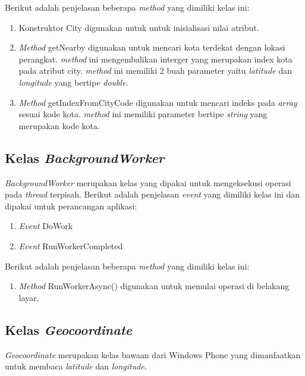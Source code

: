 Berikut adalah penjelasan beberapa \textit{method} yang dimiliki kelas ini:
\begin{enumerate}
	\item Konstruktor City digunakan untuk untuk inisialisasi nilai atribut.
	\item \textit{Method} getNearby digunakan untuk mencari kota terdekat dengan lokasi perangkat. \textit{method} ini mengembalikan interger yang merupakan index kota pada atribut city. \textit{method} ini memiliki 2 buah parameter yaitu \textit{latitude} dan \textit{longitude} yang bertipe \textit{double}.
	\item \textit{Method} getIndexFromCityCode digunakan untuk mencari indeks pada \textit{array}  sesuai kode kota. \textit{method} ini memiliki parameter bertipe \textit{string} yang merupakan kode kota.
\end{enumerate}

\subsection{Kelas \textit{BackgroundWorker}}
\label{lab:Kelas BackgroundWorker}
\hspace{0.5cm} \textit{BackgroundWorker} merupakan kelas yang dipakai untuk mengeksekusi operasi pada \textit{thread} terpisah. Berikut adalah penjelasan \textit{event} yang dimiliki kelas ini dan dipakai untuk perancangan aplikasi:
\begin{enumerate}
	\item \textit{Event} DoWork
	\item \textit{Event} RunWorkerCompleted
\end{enumerate}
Berikut adalah penjelasan beberapa \textit{method} yang dimiliki kelas ini:
\begin{enumerate}
	\item \textit{Method} RunWorkerAsync() digunakan untuk memulai operasi di belakang layar.
\end{enumerate}

\subsection{Kelas \textit{Geocoordinate}}
\label{lab:Kelas Geocoordinate}
\hspace{0.5cm} \textit{Geocoordinate} merupakan kelas bawaan dari Windows Phone yang dimanfaatkan untuk membaca \textit{latitude} dan \textit{longitude}.

